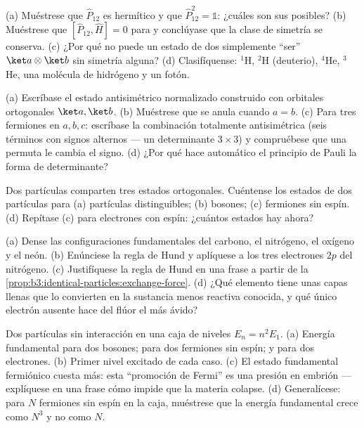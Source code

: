 \begin{exercise}[$\star$]\label{exo:b3:identical-particles:1}
(a) Muéstrese que $\hat P_{12}$ es hermítico y que $\hat P_{12}^2 = \mathbb 1$:
¿cuáles son sus  posibles? (b) Muéstrese que $[\hat P_{12}, \hat H] =
0$ para  y conclúyase que la clase de simetría se
conserva. (c) ¿Por qué no puede un estado de dos 
simplemente ``ser'' $\ket a\otimes\ket b$ sin simetría alguna? (d)
Clasifíquense: $^1$H, $^2$H (deuterio), $^4$He, $^3$He, una molécula de
hidrógeno y un fotón.
\end{exercise}

\begin{exercise}[$\star$]\label{exo:b3:identical-particles:2}
(a) Escríbase el estado antisimétrico normalizado construido con orbitales
ortogonales $\ket a, \ket b$. (b) Muéstrese que se anula cuando $a = b$. (c)
Para tres fermiones en $a, b, c$: escríbase la combinación totalmente
antisimétrica (seis términos con signos alternos --- un determinante
$3\times3$) y compruébese que una permuta le cambia el signo. (d) ¿Por qué
hace automático el principio de Pauli la forma de determinante?
\end{exercise}

\begin{exercise}[$\star$]\label{exo:b3:identical-particles:3}
Dos partículas comparten tres estados ortogonales. Cuéntense los estados de dos
partículas para (a) partículas distinguibles; (b) bosones; (c) fermiones
sin espín. (d) Repítase (c) para electrones con espín: ¿cuántos estados hay
ahora?
\end{exercise}

\begin{exercise}[$\star$]\label{exo:b3:identical-particles:4}
(a) Dense las configuraciones fundamentales del carbono, el nitrógeno, el
oxígeno y el neón. (b) Enúnciese la regla de Hund y aplíquese a los tres
electrones $2p$ del nitrógeno. (c) Justifíquese la regla de Hund en una frase
a partir de la \cref{prop:b3:identical-particles:exchange-force}. (d) ¿Qué
elemento tiene unas capas llenas que lo convierten en la sustancia menos
reactiva conocida, y qué único electrón ausente hace del flúor el más ávido?
\end{exercise}

\begin{exercise}[$\star\star$]\label{exo:b3:identical-particles:5}
Dos partículas sin interacción en una caja de niveles $E_n = n^2E_1$.
(a) Energía fundamental para dos bosones; para dos fermiones sin espín; y
para dos electrones. (b) Primer nivel excitado de cada caso. (c) El estado
fundamental fermiónico cuesta más: esta ``promoción de Fermi'' es una
presión en embrión --- explíquese en una frase cómo impide que la materia
colapse. (d) Generalícese: para $N$ fermiones sin espín en la caja,
muéstrese que la energía fundamental crece como $N^3$ y no como $N$.
\end{exercise}

